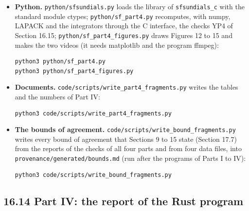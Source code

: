 \documentclass[
  10pt,
]{article}
\begin{document}
\begin{itemize}
\begin{verbatim}
cd rust
cargo build --release
./target/release/sf_part4
\end{verbatim}

  Output: \texttt{data/hck\_part4\_checks.txt} and the data files of
  Section 16.16; about twenty minutes (1203 s) on two processor cores
  (the right side of (6.6) is shared among the cores of the machine).
\item
  \textbf{Python.} \texttt{python/sfsundials.py} loads the library of
  \texttt{sfsundials\_c} with the standard module ctypes;
  \texttt{python/sf\_part4.py} recomputes, with numpy, LAPACK and the
  integrators through the C interface, the checks YP4 of Section 16.15;
  \texttt{python/sf\_part4\_figures.py} draws Figures 12 to 15 and makes
  the two videos (it needs matplotlib and the program ffmpeg):

\begin{verbatim}
python3 python/sf_part4.py
python3 python/sf_part4_figures.py
\end{verbatim}
\item
  \textbf{Documents.} \texttt{code/scripts/write\_part4\_fragments.py}
  writes the tables and the numbers of Part IV:

\begin{verbatim}
python3 code/scripts/write_part4_fragments.py
\end{verbatim}
\item
  \textbf{The bounds of agreement.}
  \texttt{code/scripts/write\_bound\_fragments.py} writes every bound of
  agreement that Sections 9 to 15 state (Section 17.7) from the reports
  of the checks of all four parts and from four data files, into
  \texttt{provenance/generated/bounds.md} (run after the programs of
  Parts I to IV):

\begin{verbatim}
python3 code/scripts/write_bound_fragments.py
\end{verbatim}
\end{itemize}

\hypertarget{part-iv-the-report-of-the-rust-program}{%
\subsection{16.14 Part IV: the report of the Rust
program}\label{part-iv-the-report-of-the-rust-program}}
\end{document}
